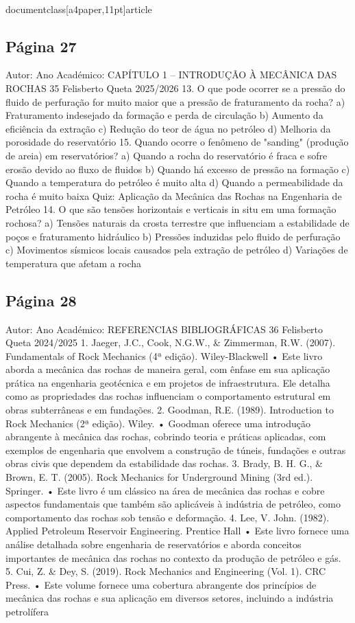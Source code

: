 \\documentclass[a4paper,11pt]{article}
\begin{document}
\subsection*{Página 27}
Autor:
Ano Académico:
CAPÍTULO 1 – INTRODUÇÃO À MECÂNICA DAS ROCHAS
35
Felisberto Queta
2025/2026
13. O que pode ocorrer se a pressão do fluido de perfuração for muito maior que a pressão de fraturamento da 
rocha?
a) Fraturamento indesejado da formação e perda de circulação
b) Aumento da eficiência da extração
c) Redução do teor de água no petróleo
d) Melhoria da porosidade do reservatório
15. Quando ocorre o fenômeno de "sanding" (produção de areia) em reservatórios?
a) Quando a rocha do reservatório é fraca e sofre erosão devido ao fluxo de fluidos
b) Quando há excesso de pressão na formação
c) Quando a temperatura do petróleo é muito alta
d) Quando a permeabilidade da rocha é muito baixa
Quiz: Aplicação da Mecânica das Rochas na Engenharia de Petróleo
14. O que são tensões horizontais e verticais in situ em uma formação rochosa?
a) Tensões naturais da crosta terrestre que influenciam a estabilidade de poços e fraturamento hidráulico
b) Pressões induzidas pelo fluido de perfuração
c) Movimentos sísmicos locais causados pela extração de petróleo
d) Variações de temperatura que afetam a rocha



\subsection*{Página 28}
Autor:
Ano Académico:
REFERENCIAS BIBLIOGRÁFICAS
36
Felisberto Queta
2024/2025
1. Jaeger, J.C., Cook, N.G.W., \& Zimmerman, R.W. (2007). Fundamentals of Rock Mechanics (4ª edição). 
Wiley-Blackwell
•
Este livro aborda a mecânica das rochas de maneira geral, com ênfase em sua aplicação prática na 
engenharia geotécnica e em projetos de infraestrutura. Ele detalha como as propriedades das rochas 
influenciam o comportamento estrutural em obras subterrâneas e em fundações.
2. Goodman, R.E. (1989). Introduction to Rock Mechanics (2ª edição). Wiley.
•
Goodman oferece uma introdução abrangente à mecânica das rochas, cobrindo teoria e práticas 
aplicadas, com exemplos de engenharia que envolvem a construção de túneis, fundações e outras obras 
civis que dependem da estabilidade das rochas.
3. Brady, B. H. G., \& Brown, E. T. (2005). Rock Mechanics for Underground Mining (3rd ed.). Springer.
•
Este livro é um clássico na área de mecânica das rochas e cobre aspectos fundamentais que também 
são aplicáveis à indústria de petróleo, como comportamento das rochas sob tensão e deformação.
4. Lee, V. John. (1982). Applied Petroleum Reservoir Engineering. Prentice Hall
•
Este livro fornece uma análise detalhada sobre engenharia de reservatórios e aborda conceitos 
importantes de mecânica das rochas no contexto da produção de petróleo e gás.
5. Cui, Z. \& Dey, S. (2019). Rock Mechanics and Engineering (Vol. 1). CRC Press.
•
Este volume fornece uma cobertura abrangente dos princípios de mecânica das rochas e sua aplicação 
em diversos setores, incluindo a indústria petrolífera
\end{document}
